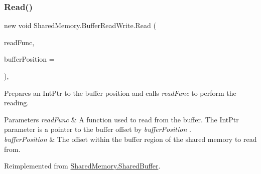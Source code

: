 \mbox{\label{class_shared_memory_1_1_buffer_read_write_ad8e09d6fb5fd4f72170e768f7b84911d}} 
\subsubsection{\texorpdfstring{Read()}{Read()}\hspace{0.1cm}{\footnotesize\ttfamily [2/2]}}
{\footnotesize\ttfamily new void Shared\+Memory.\+Buffer\+Read\+Write.\+Read (\begin{DoxyParamCaption}\item[{Action$<$ Int\+Ptr $>$}]{read\+Func,  }\item[{long}]{buffer\+Position = {} }\end{DoxyParamCaption})\hspace{0.3cm}{\ttfamily [inline]}, {\ttfamily [virtual]}}



Prepares an Int\+Ptr to the buffer position and calls {\itshape read\+Func}  to perform the reading. 


\begin{DoxyParams}{Parameters}
{\em read\+Func} & A function used to read from the buffer. The Int\+Ptr parameter is a pointer to the buffer offset by {\itshape buffer\+Position} .\\
\hline
{\em buffer\+Position} & The offset within the buffer region of the shared memory to read from.\\
\hline
\end{DoxyParams}


Reimplemented from \hyperlink{class_shared_memory_1_1_shared_buffer_aea88361c8c00b0159fe3dacc769a8465}{Shared\+Memory.\+Shared\+Buffer}.

\mbox{\label{class_shared_memory_1_1_buffer_read_write_a4fc92192136290cea195db4ee573843e}} 
